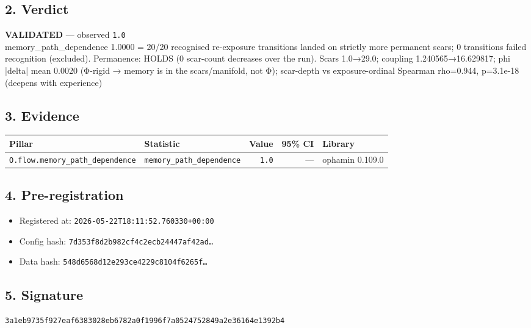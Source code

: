 \documentclass{article}
\begin{document}
\subsection*{2. Verdict}
\textcolor{validated}{\textbf{VALIDATED}} --- observed \texttt{1.0}\\
memory\_path\_dependence 1.0000 = 20/20 recognised re-exposure transitions landed on strictly more permanent scars; 0 transitions failed recognition (excluded). Permanence: HOLDS (0 scar-count decreases over the run). Scars 1.0→29.0; coupling 1.240565→16.629817; phi |delta| mean 0.0020 (Φ-rigid → memory is in the scars/manifold, not Φ); scar-depth vs exposure-ordinal Spearman rho=0.944, p=3.1e-18 (deepens with experience)
\subsection*{3. Evidence}
\begin{tabular}{llrrl}\toprule
\textbf{Pillar} & \textbf{Statistic} & \textbf{Value} & \textbf{95\% CI} & \textbf{Library} \\\midrule
\texttt{O.flow.memory\_path\_dependence} & \texttt{memory\_path\_dependence} & \texttt{1.0} & --- & ophamin 0.109.0 \\
\bottomrule\end{tabular}
\subsection*{4. Pre-registration}
\begin{itemize}
\item Registered at: \texttt{2026-05-22T18:11:52.760330+00:00}
\item Config hash: \texttt{7d353f8d2b982cf4c2ecb24447af42ad\dots}
\item Data hash: \texttt{548d6568d12e293ce4229c8104f6265f\dots}
\end{itemize}
\subsection*{5. Signature}
\texttt{3a1eb9735f927eaf6383028eb6782a0f1996f7a0524752849a2e36164e1392b4}\\
\end{document}
